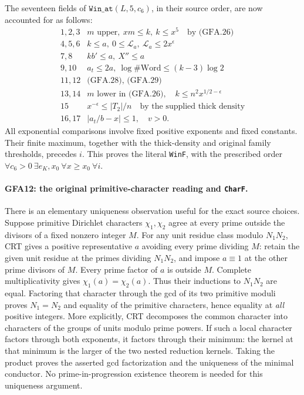 The seventeen fields of $\texttt{Win\_at}(L,5,c_6)$, in their
source order, are now accounted for as follows:
\[
\begin{array}{c|l}
1,2,3 & m\text{ upper},\ xm\le k,\ k\le x^5\quad\text{by (GFA.26)}\\
4,5,6 & k\le a,\ 0\le\mathcal L_a,\ \mathcal L_a\le2x^\epsilon\\
7,8 & kb'\le a,\ X''\le a\\
9,10 & a_t\le2a,\ \log\#\mathrm{Word}\le(k-3)\log2\\
11,12 & \text{(GFA.28), (GFA.29)}\\
13,14 & m\text{ lower in (GFA.26)},\quad k\le n^2x^{1/2-\epsilon}\\
15 & x^{-\epsilon}\le |T_2|/n\quad\text{by the supplied thick density}\\
16,17 & |a_t/b-x|\le1,\quad v>0.
\end{array}
\]
All exponential comparisons involve fixed positive exponents
and fixed constants.  Their finite maximum, together with the
thick-density and original family thresholds, precedes $i$.
This proves the literal \texttt{WinF}, with the prescribed
order $\forall c_6>0\ \exists e_K,x_0\ \forall x\ge x_0\ \forall i$.

\paragraph{GFA12: the original primitive-character reading and \texttt{CharF}.}
\label{claim:GFA12}
There is an elementary uniqueness observation useful for the
exact source choices.  Suppose primitive Dirichlet characters
$\chi_1,\chi_2$ agree at every prime outside the divisors of
a fixed nonzero integer $M$.  For any unit residue class modulo
$N_1N_2$, CRT gives a positive representative $a$ avoiding
every prime dividing $M$: retain the given unit residue at
the primes dividing $N_1N_2$, and impose $a\equiv1$ at the
other prime divisors of $M$.  Every prime factor of $a$ is
outside $M$.  Complete multiplicativity gives
$\chi_1(a)=\chi_2(a)$.  Thus their inductions to $N_1N_2$
are equal.  Factoring that character through the gcd of its
two primitive moduli proves $N_1=N_2$ and equality of the
primitive characters, hence equality at \emph{all} positive
integers.  More explicitly, CRT decomposes the common character
into characters of the groups of units modulo prime powers.
If such a local character factors through both exponents,
it factors through their minimum: the kernel at that minimum
is the larger of the two nested reduction kernels.  Taking
the product proves the asserted gcd factorization and the
uniqueness of the minimal conductor.  No prime-in-progression existence theorem is needed
for this uniqueness argument.

